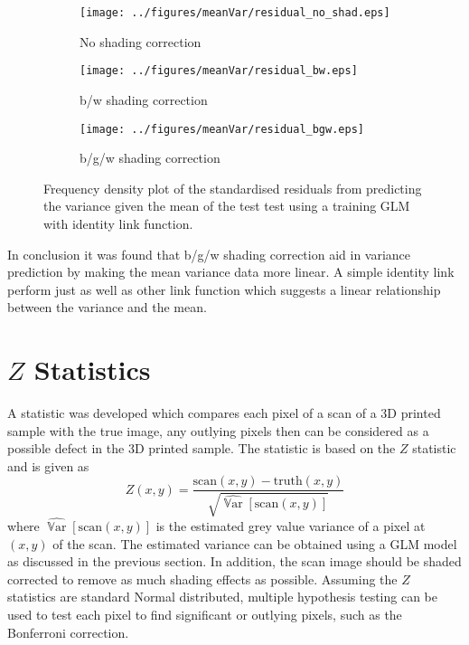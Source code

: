 \documentclass[a4paper]{proc}
\DeclareMathOperator{\variance}{\mathbb{V}ar}
\begin{document}
\begin{figure*}
	\centering
	\begin{subfigure}{0.45\textwidth}
		\centering
		\texttt{[image: ../figures/meanVar/residual\_no\_shad.eps]}
		\caption{No shading correction}
	\end{subfigure}
	\begin{subfigure}{0.45\textwidth}
		\centering
		\texttt{[image: ../figures/meanVar/residual\_bw.eps]}
		\caption{b/w shading correction}
	\end{subfigure}
	\begin{subfigure}{0.45\textwidth}
		\centering
		\texttt{[image: ../figures/meanVar/residual\_bgw.eps]}
		\caption{b/g/w shading correction}
	\end{subfigure}
	\caption{Frequency density plot of the standardised residuals from predicting the variance given the mean of the test test using a training GLM with identity link function.}
	\label{fig:glm_residual}
\end{figure*}

In conclusion it was found that b/g/w shading correction aid in variance prediction by making the mean variance data more linear. A simple identity link perform just as well as other link function which suggests a linear relationship between the variance and the mean.

\section{$Z$ Statistics}

A statistic was developed which compares each pixel of a scan of a 3D printed sample with the true image, any outlying pixels then can be considered as a possible defect in the 3D printed sample. The statistic is based on the $Z$ statistic and is given as
\begin{equation}
Z(x,y) = \frac{\text{scan}(x,y) - \text{truth}(x,y)}{\sqrt{\widehat{\variance}[\text{scan}(x,y)]}}
\end{equation}
where $\widehat{\variance}[\text{scan}(x,y)]$ is the estimated grey value variance of a pixel at $(x,y)$ of the scan. The estimated variance can be obtained using a GLM model as discussed in the previous section. In addition, the scan image should be shaded corrected to remove as much shading effects as possible. Assuming the $Z$ statistics are standard Normal distributed, multiple hypothesis testing can be used to test each pixel to find significant or outlying pixels, such as the Bonferroni correction.
\end{document}
